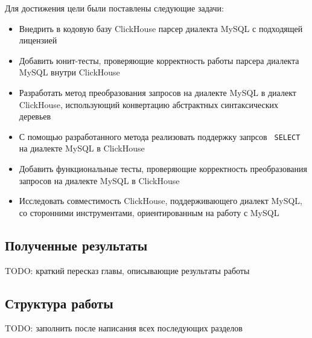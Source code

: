 Для достижения цели были поставлены следующие задачи:
\begin{itemize}
  \item Внедрить в кодовую базу ClickHouse парсер диалекта MySQL с подходящей лицензией
  \item Добавить юнит-тесты, проверяющие корректность работы парсера диалекта MySQL внутри ClickHouse
  \item Разработать метод преобразования запросов на диалекте MySQL в диалект ClickHouse, использующий конвертацию абстрактных синтаксических деревьев
  \item С помощью разработанного метода реализовать поддержку запрсов \texttt{ SELECT } на диалекте MySQL в ClickHouse
  \item Добавить функциональные тесты, проверяющие корректность преобразования запросов на диалекте MySQL в ClickHouse
  \item Исследовать совместимость ClickHouse, поддерживающего диалект MySQL, со сторонними инструментами, ориентированным на работу с MySQL
\end{itemize}

\subsection{Полученные результаты}
TODO: краткий пересказ главы, описывающие результаты работы

\subsection{Структура работы}
TODO: заполнить после написания всех последующих разделов
